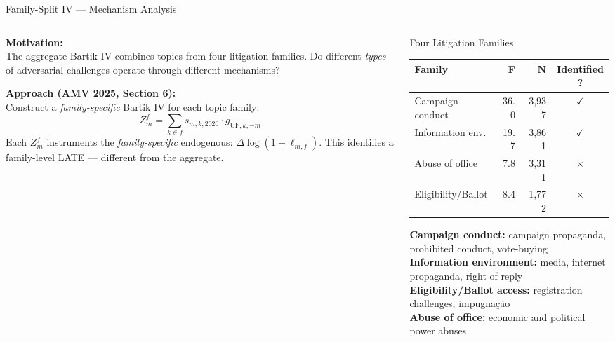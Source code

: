 \documentclass[aspectratio=169,10pt]{beamer}
\newcommand{\tick}{{\color{mygreen}$\checkmark$}}
\newcommand{\cross}{{\color{myred}$\times$}}
\begin{document}
\begin{frame}{Family-Split IV --- Mechanism Analysis}
\begin{columns}[T]
\begin{column}{0.55\textwidth}
\textbf{Motivation:}\\
The aggregate Bartik IV combines topics from four litigation families. Do different \emph{types} of adversarial challenges operate through different mechanisms?
\bigskip

\textbf{Approach (AMV 2025, Section 6):}\\
Construct a \emph{family-specific} Bartik IV for each topic family:
\[
Z_m^{f} = \sum_{k \in f} s_{m,k,2020} \cdot g_{\text{UF},k,-m}
\]
Each $Z_m^f$ instruments the \emph{family-specific} endogenous: $\Delta\log(1+\ell_{m,f})$. This identifies a family-level LATE --- different from the aggregate.
\end{column}
\begin{column}{0.43\textwidth}
\begin{block}{Four Litigation Families}
  \footnotesize
  \renewcommand{\arraystretch}{1.2}
  \begin{tabular}{lrrc}
    \toprule
    Family & F & N & Identified? \\
    \midrule
    Campaign conduct & 36.0 & 3,937 & \tick \\
    Information env. & 19.7 & 3,861 & \tick \\
    Abuse of office & 7.8 & 3,311 & \cross \\
    Eligibility/Ballot & 8.4 & 1,772 & \cross \\
    \bottomrule
  \end{tabular}
  \normalsize
\end{block}
\medskip
\footnotesize
\textbf{Campaign conduct:} campaign propaganda, prohibited conduct, vote-buying\\[4pt]
\textbf{Information environment:} media, internet propaganda, right of reply\\[4pt]
\textbf{Eligibility/Ballot access:} registration challenges, impugna\c{c}\~{a}o\\[4pt]
\textbf{Abuse of office:} economic and political power abuses
\end{column}
\end{columns}
\end{frame}
\end{document}
